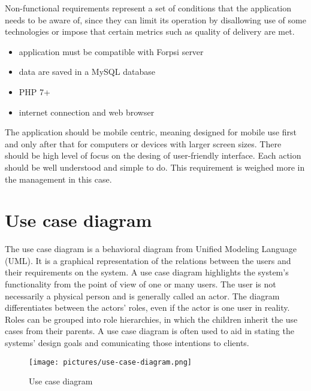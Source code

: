 \documentclass[
  digital,     %
  oneside,     %
  nosansbold,  %
  colorbold, %
  lof,         %
  lot,         %
]{fithesis4}
\begin{document}
Non-functional requirements represent a set of conditions that the application needs to be aware of, since they can limit its operation by disallowing use of some technologies or impose that certain metrics such as quality of delivery are met.

\begin{itemize}
	\item application must be compatible with Forpsi server~\cite{forpsi}
	\item data are saved in a MySQL database
	\item PHP 7+
	\item internet connection and web browser
\end{itemize}

The application should be mobile centric, meaning designed for mobile use first and only after that for computers or devices with larger screen sizes. There should be high level of focus on the desing of user-friendly interface. Each action should be well understood and simple to do. This requirement is weighed more in the management in this case.

\section{Use case diagram}

The use case diagram is a behavioral diagram from Unified Modeling Language (UML). It is a graphical representation of the relations between the users and their requirements on the system. A use case diagram highlights the system's functionality from the point of view of one or many users. The user is not necessarily a physical person and is generally called an actor. The diagram differentiates between the actors' roles, even if the actor is one user in reality. Roles can be grouped into role hierarchies, in which the children inherit the use cases from their parents. A use case diagram is often used to aid in stating the systems' design goals and comunicating those intentions to clients.

\begin{figure}
	\begin{center}
		\begin{minipage}{1\textwidth}
			\texttt{[image: pictures/use-case-diagram.png]}
		\end{minipage}
	\end{center}
	\caption{Use case diagram}
	\label{fig:use-case}
\end{figure}
\end{document}
